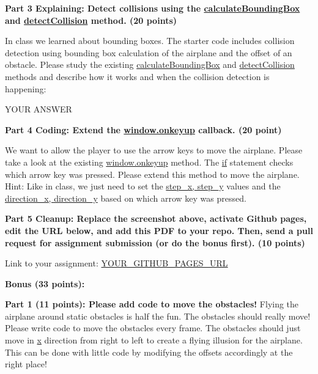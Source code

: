 \documentclass[10pt,oneside,onecolumn,letterpaper]{article}
\begin{document}
\vspace{.5cm}

\noindent\textbf{Part 3 Explaining: Detect collisions using the \url{calculateBoundingBox} and \url{detectCollision} method. (20 points)}

\vspace{.5cm}

In class we learned about bounding boxes. The starter code includes collision detection using bounding box calculation of the airplane and the offset of an obstacle. Please study the existing \url{calculateBoundingBox} and \url{detectCollision} methods and describe how it works and when the collision detection is happening:

\vspace{.5cm}

YOUR ANSWER

\vspace{5cm}

\noindent\textbf{Part 4 Coding: Extend the \url{window.onkeyup} callback. (20 point)}

\vspace{.5cm}

We want to allow the player to use the arrow keys to move the airplane. Please take a look at the existing \url{window.onkeyup} method. The \url{if} statement checks which arrow key was pressed. Please extend this method to move the airplane. Hint: Like in class, we just need to set the \url{step_x, step_y} values and the \url{direction_x, direction_y} based on which arrow key was pressed.

\vspace{.5cm}

\noindent\textbf{Part 5 Cleanup: Replace the screenshot above, activate Github pages, edit the URL below, and add this PDF to your repo. Then, send a pull request for assignment submission (or do the bonus first). (10 points)}

\vspace{.5cm}

Link to your assignment: \url{YOUR_GITHUB_PAGES_URL}


\clearpage
\noindent\textbf{Bonus (33 points):}


\vspace{.5cm} %

\noindent\textbf{Part 1 (11 points): Please add code to move the obstacles!} Flying the airplane around static obstacles is half the fun. The obstacles should really move! Please write code to move the obstacles every frame. The obstacles should just move in \url{x} direction from right to left to create a flying illusion for the airplane. This can be done with little code by modifying the offsets accordingly at the right place!
\end{document}
